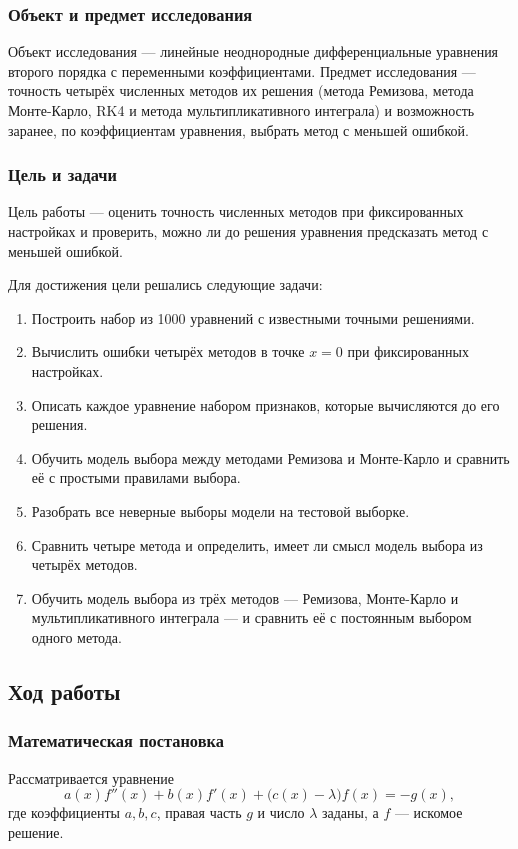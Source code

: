 \documentclass[14pt,a4paper]{extarticle}
\begin{document}
\subsubsection{Объект и предмет исследования}
Объект исследования --- линейные неоднородные дифференциальные
уравнения второго порядка с переменными коэффициентами. Предмет
исследования --- точность четырёх численных методов их решения (метода
Ремизова, метода Монте-Карло, RK4 и метода мультипликативного интеграла)
и возможность заранее, по коэффициентам уравнения, выбрать метод
с меньшей ошибкой.

\subsubsection{Цель и задачи}
Цель работы --- оценить точность численных методов при фиксированных
настройках и проверить, можно ли до решения уравнения предсказать метод
с меньшей ошибкой.

Для достижения цели решались следующие задачи:
\begin{enumerate}
\item Построить набор из 1000 уравнений с известными точными решениями.
\item Вычислить ошибки четырёх методов в точке $x=0$ при фиксированных
настройках.
\item Описать каждое уравнение набором признаков, которые вычисляются
до его решения.
\item Обучить модель выбора между методами Ремизова и Монте-Карло
и сравнить её с простыми правилами выбора.
\item Разобрать все неверные выборы модели на тестовой выборке.
\item Сравнить четыре метода и определить, имеет ли смысл модель выбора
из четырёх методов.
\item Обучить модель выбора из трёх методов --- Ремизова, Монте-Карло
и мультипликативного интеграла --- и сравнить её с постоянным выбором
одного метода.
\end{enumerate}

\subsection{Ход работы}
\subsubsection{Математическая постановка}
Рассматривается уравнение
\begin{equation}\label{eq:ode}
a(x)f''(x)+b(x)f'(x)+\bigl(c(x)-\lambda\bigr)f(x)=-g(x),
\end{equation}
где коэффициенты $a,b,c$, правая часть $g$ и число $\lambda$ заданы,
а $f$ --- искомое решение.
\end{document}
